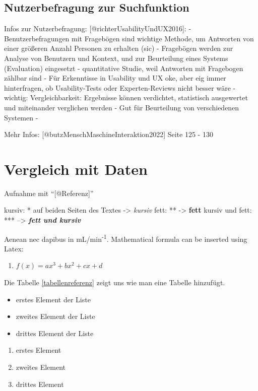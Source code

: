 \documentclass[
  12pt,
  a4paperpaper,
]{report}
\providecommand{\tightlist}{%
  \setlength{\itemsep}{0pt}\setlength{\parskip}{0pt}}
\begin{document}
\subsection{Nutzerbefragung zur
Suchfunktion}\label{nutzerbefragung-zur-suchfunktion}

Infos zur Nutzerbefragung: {[}@richterUsabilityUndUX2016{]}: -
Benutzerbefragungen mit Fragebögen sind wichtige Methode, um Antworten
von einer größeren Anzahl Personen zu erhalten (sic) - Fragebögen werden
zur Analyse von Benutzern und Kontext, und zur Beurteilung eines Systems
(Evaluation) eingesetzt - quantitative Studie, weil Antworten mit
Fragebogen zählbar sind - Für Erkenntisse in Usability und UX oke, aber
eig immer hinterfragen, ob Usability-Tests oder Experten-Reviews nicht
besser wäre - wichtig: Vergleichbarkeit: Ergebnisse können verdichtet,
statistisch ausgewertet und miteinander verglichen werden - Gut für
Beurteilung von verschiedenen Systemen -

Mehr Infos: {[}@butzMenschMaschineInteraktion2022{]} Seite 125 - 130

\section{Vergleich mit Daten}\label{vergleich-mit-daten}

Aufnahme mit ``{[}@Referenz{]}''

kursiv: * auf beiden Seiten des Textes -\textgreater{} \emph{kursiv}
fett: ** -\textgreater{} \textbf{fett} kursiv und fett: ***
--\textgreater{} \textbf{\emph{fett und kursiv}}

Aenean nec dapibus in mL/min\textsuperscript{-1}. Mathematical formula
can be inserted using Latex:

\begin{enumerate}
\def\labelenumi{(\arabic{enumi})}
\tightlist
\item
  \(f(x) = ax^3 + bx^2 + cx + d\)
\end{enumerate}

Die Tabelle \ref{tabellenreferenz} zeigt uns wie man eine Tabelle
hinzufügt.

\begin{itemize}
\tightlist
\item
  erstes Element der Liste
\item
  zweites Element der Liste
\item
  drittes Element der Liste
\end{itemize}

\begin{enumerate}
\def\labelenumi{\arabic{enumi}.}
\tightlist
\item
  erstes Element
\item
  zweites Element
\item
  drittes Element
\end{enumerate}
\end{document}
